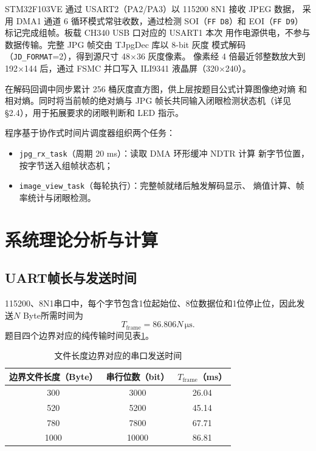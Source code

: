 \documentclass[a4paper]{article}
\newcommand{\unit}[1]{\ensuremath{\,\mathrm{#1}}}
\begin{document}
STM32F103VE 通过 USART2（PA2/PA3）以 115200 8N1 接收 JPEG 数据，
采用 DMA1 通道 6 循环模式常驻收数，通过检测 SOI（\texttt{FF D8}）和
EOI（\texttt{FF D9}）标记完成组帧。板载 CH340 USB 口对应的 USART1 本次
用作电源供电，不参与数据传输。完整 JPG 帧交由 TJpgDec 库以 8-bit 灰度
模式解码（\texttt{JD\_FORMAT}=2），得到源尺寸 48$\times$36 灰度像素。
像素经 4 倍最近邻整数放大到 192$\times$144 后，通过 FSMC 并口写入
ILI9341 液晶屏（320$\times$240）。

在解码回调中同步累计 256 桶灰度直方图，供上层按题目公式计算图像绝对熵
和相对熵。同时将当前帧的绝对熵与 JPG 帧长共同输入闭眼检测状态机（详见
§2.4），用于拓展要求的闭眼判断和 LED 指示。

程序基于协作式时间片调度器组织两个任务：
\begin{itemize}
\item \texttt{jpg\_rx\_task}（周期 20 ms）：读取 DMA 环形缓冲 NDTR 计算
新字节位置，按字节送入组帧状态机；
\item \texttt{image\_view\_task}（每轮执行）：完整帧就绪后触发解码显示、
熵值计算、帧率统计与闭眼检测。
\end{itemize}


\newpage
\section{系统理论分析与计算}

\subsection{UART帧长与发送时间}
115200、8N1串口中，每个字节包含1位起始位、8位数据位和1位停止位，因此发送$N$ Byte所需时间为
\begin{equation}
T_{\mathrm{frame}}=86.806N\unit{\mu s}.
\end{equation}
题目四个边界对应的纯传输时间见表\ref{tab:time_threshold}。

\begin{table}[H]
\centering
\caption{文件长度边界对应的串口发送时间}
\label{tab:time_threshold}
\begin{tabular}{ccc}
\toprule
边界文件长度（Byte） & 串行位数（bit） & $T_{\mathrm{frame}}$（ms）\\
\midrule
300  & 3000  & 26.04\\
520  & 5200  & 45.14\\
780  & 7800  & 67.71\\
1000 & 10000 & 86.81\\
\bottomrule
\end{tabular}
\end{table}
\end{document}
